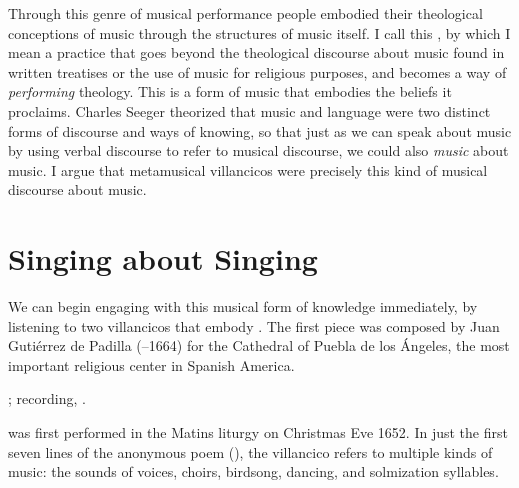 
Through this genre of musical performance people embodied their theological
conceptions of music through the structures of music itself.
I call this , by which I mean a practice that goes
beyond the theological discourse about music found in written treatises or the
use of music for religious purposes, and becomes a way of \emph{performing}
theology.
This is a form of music that embodies the beliefs it proclaims.
Charles Seeger theorized that music and language were two distinct forms of
discourse and ways of knowing, so that just as we can speak about music by
using verbal discourse to refer to musical discourse, we could also
\emph{music} about music.%
    \Autocites
    {Seeger:Unitary}
    {Small:Musicking}
I argue that metamusical villancicos were precisely this kind of musical
discourse about music.


\section{Singing about Singing}

We can begin engaging with this musical form of knowledge immediately, by
listening to two villancicos that embody .%
    \Autocites
    {Murata:Singing}
The first piece was composed by Juan Gutiérrez de Padilla (--1664)
for the Cathedral of Puebla de los Ángeles, the most important religious center
in Spanish America.%
\begin{Footnote}
    ; 
    recording, \autocite{Padilla:1652ChristmasCD}.
\end{Footnote}
 was first performed in the Matins liturgy
on Christmas Eve 1652.  
In just the first seven lines of the anonymous poem
(), the villancico
refers to multiple kinds of music: the sounds of voices, choirs, birdsong,
dancing, and solmization syllables.


